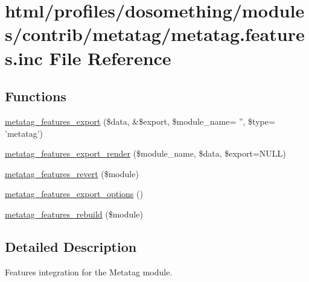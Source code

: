 \hypertarget{metatag_8features_8inc}{
\section{html/profiles/dosomething/modules/contrib/metatag/metatag.features.inc File Reference}
\label{metatag_8features_8inc}
}
\subsection*{Functions}
\begin{DoxyCompactItemize}
\item 
\hyperlink{metatag_8features_8inc_ab1bd20f321011d0a687e6c7cf8bb6ae3}{metatag\_\-features\_\-export} (\$data, \&\$export, \$module\_\-name= '', \$type= 'metatag')
\item 
\hyperlink{metatag_8features_8inc_a55fe0434facdf5b5a728cdb5d38c6db6}{metatag\_\-features\_\-export\_\-render} (\$module\_\-name, \$data, \$export=NULL)
\item 
\hyperlink{metatag_8features_8inc_ae36fc91390d329f8561acc8df4b91f72}{metatag\_\-features\_\-revert} (\$module)
\item 
\hyperlink{metatag_8features_8inc_ad3e8a6d8ae94b93e271623bbc6a43a20}{metatag\_\-features\_\-export\_\-options} ()
\item 
\hyperlink{metatag_8features_8inc_a968c130a7b02c7c616dabc8eb54b84f1}{metatag\_\-features\_\-rebuild} (\$module)
\end{DoxyCompactItemize}


\subsection{Detailed Description}
Features integration for the Metatag module. 

